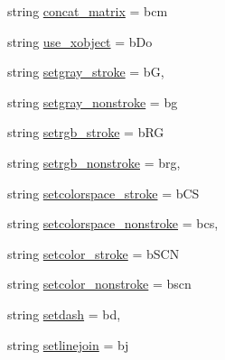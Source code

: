 \begin{DoxyCompactItemize}
\item 
string \hyperlink{classmatplotlib_1_1backends_1_1backend__pdf_1_1Op_a1019a52ebd04286d57b34ca63b2db95f}{concat\+\_\+matrix} = b\textquotesingle{}cm\textquotesingle{}
\item 
string \hyperlink{classmatplotlib_1_1backends_1_1backend__pdf_1_1Op_a6e747721ee20a13fb76955b0d639d1f5}{use\+\_\+xobject} = b\textquotesingle{}Do\textquotesingle{}
\item 
string \hyperlink{classmatplotlib_1_1backends_1_1backend__pdf_1_1Op_a95382da3e11dcbb9790ec79c8afa4cb1}{setgray\+\_\+stroke} = b\textquotesingle{}G\textquotesingle{},
\item 
string \hyperlink{classmatplotlib_1_1backends_1_1backend__pdf_1_1Op_acd9edfb9f2148f9665132693ccee9cdb}{setgray\+\_\+nonstroke} = b\textquotesingle{}g\textquotesingle{}
\item 
string \hyperlink{classmatplotlib_1_1backends_1_1backend__pdf_1_1Op_aff5f1456186c4ffb30a97552c66c8aab}{setrgb\+\_\+stroke} = b\textquotesingle{}RG\textquotesingle{}
\item 
string \hyperlink{classmatplotlib_1_1backends_1_1backend__pdf_1_1Op_a9b06e4197faeb355c0bd355fbfb22b92}{setrgb\+\_\+nonstroke} = b\textquotesingle{}rg\textquotesingle{},
\item 
string \hyperlink{classmatplotlib_1_1backends_1_1backend__pdf_1_1Op_a49292653c17937849168a57067589b89}{setcolorspace\+\_\+stroke} = b\textquotesingle{}CS\textquotesingle{}
\item 
string \hyperlink{classmatplotlib_1_1backends_1_1backend__pdf_1_1Op_a160c9145a205171b5534bb8331fd4b79}{setcolorspace\+\_\+nonstroke} = b\textquotesingle{}cs\textquotesingle{},
\item 
string \hyperlink{classmatplotlib_1_1backends_1_1backend__pdf_1_1Op_a05c6b7c97019a4c58e6706c1cdeca55f}{setcolor\+\_\+stroke} = b\textquotesingle{}S\+CN\textquotesingle{}
\item 
string \hyperlink{classmatplotlib_1_1backends_1_1backend__pdf_1_1Op_a06ef6102bf055b5bdd76ecdc4b99164d}{setcolor\+\_\+nonstroke} = b\textquotesingle{}scn\textquotesingle{}
\item 
string \hyperlink{classmatplotlib_1_1backends_1_1backend__pdf_1_1Op_acb05aea396bc65bad8b8bff5b3c676f7}{setdash} = b\textquotesingle{}d\textquotesingle{},
\item 
string \hyperlink{classmatplotlib_1_1backends_1_1backend__pdf_1_1Op_a11c2c3f483c7cf29f32e4ce3e001ae7b}{setlinejoin} = b\textquotesingle{}j\textquotesingle{}
\item 

\end{DoxyCompactItemize}
